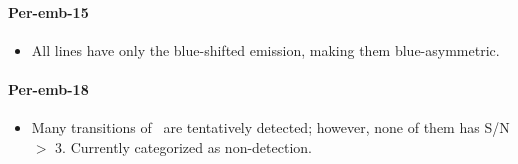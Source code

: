 
\paragraph{Per-emb-15}
\begin{itemize}
  \item All lines have only the blue-shifted emission, making them blue-asymmetric.
\end{itemize}


\paragraph{Per-emb-18}
\begin{itemize}
  \item Many transitions of \methylformate\ are tentatively detected; however, none of them has S/N $>$ 3.  Currently categorized as non-detection.
\end{itemize}



